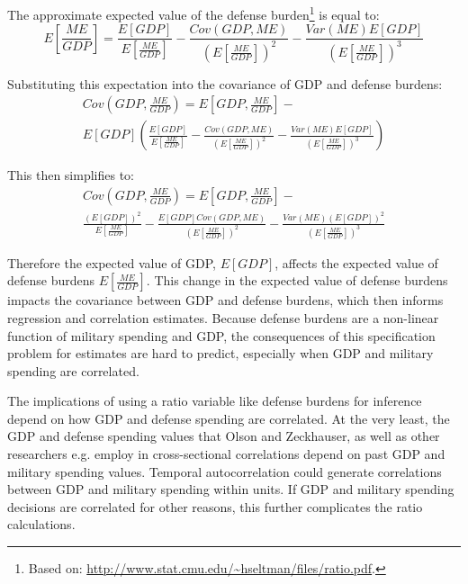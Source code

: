 \documentclass[12pt]{article}
\begin{document}
The approximate expected value of the defense burden\footnote{Based on: \url{http://www.stat.cmu.edu/~hseltman/files/ratio.pdf}.} is equal to:
\begin{equation}
E\left[\frac{ME}{GDP} \right] = \frac{E[GDP]}{E\left[\frac{ME}{GDP} \right]} - \frac{Cov(GDP, ME)}{\left(E\left[\frac{ME}{GDP} \right]\right)^2} - \frac{Var(ME) E[GDP]}{\left(E\left[\frac{ME}{GDP} \right]\right)^3}
\end{equation}

Substituting this expectation into the covariance of GDP and defense burdens:
\begin{multline}
Cov\left(GDP, \frac{ME}{GDP} \right) = E\left[GDP, \frac{ME}{GDP} \right] - \\ E[GDP] \left( \frac{E[GDP]}{E\left[\frac{ME}{GDP} \right]} - \frac{Cov(GDP, ME)}{\left(E\left[\frac{ME}{GDP} \right]\right)^2} - \frac{Var(ME) E[GDP]}{\left(E\left[\frac{ME}{GDP} \right]\right)^3} \right)
\end{multline}

This then simplifies to:
\begin{multline}
Cov\left(GDP, \frac{ME}{GDP} \right) = E\left[GDP, \frac{ME}{GDP} \right] - \\ \frac{(E[GDP])^2}{E\left[\frac{ME}{GDP} \right]} - \frac{E[GDP] Cov(GDP, ME)}{\left(E\left[\frac{ME}{GDP} \right]\right)^2} - \frac{Var(ME) (E[GDP])^2}{\left(E\left[\frac{ME}{GDP} \right]\right)^3}
\end{multline}

Therefore the expected value of GDP, $E[GDP]$, affects the expected value of defense burdens $E\left[\frac{ME}{GDP} \right]$.
This change in the expected value of defense burdens impacts the covariance between GDP and defense burdens, which then informs regression and correlation estimates.  
Because defense burdens are a non-linear function of military spending and GDP, the consequences of this specification problem for estimates are hard to predict, especially when GDP and military spending are correlated. 


The implications of using a ratio variable like defense burdens for inference depend on how GDP and defense spending are correlated. 
At the very least, the GDP and defense spending values that Olson and Zeckhauser, as well as other researchers e.g.\citep{Oneal1990, KimSandler2019} employ in cross-sectional correlations depend on past GDP and military spending values. 
Temporal autocorrelation could generate correlations between GDP and military spending within units.  
If GDP and military spending decisions are correlated for other reasons, this further complicates the ratio calculations. 
\end{document}
